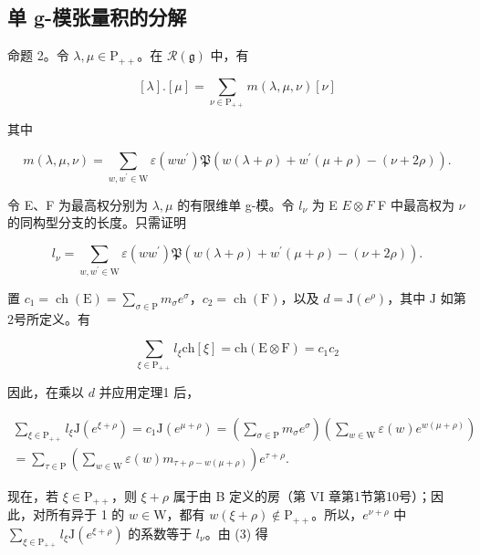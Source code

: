 \subsection{单 g-模张量积的分解}

命题 2。令 \(\lambda, \mu \in \mathrm{P}_{++}\)。在 \(\mathcal{R}(\mathfrak{g})\) 中，有

\[
[ \lambda ]. [ \mu ] = \sum_ {\nu \in \mathrm{P} _ {+ +}} m (\lambda , \mu , \nu) [ \nu ]
\]

其中

\[
m (\lambda , \mu , \nu) = \sum_ {w, w ^ {\prime} \in \mathrm{W}} \varepsilon (w w ^ {\prime}) \mathfrak {P} (w (\lambda + \rho) + w ^ {\prime} (\mu + \rho) - (\nu + 2 \rho)).
\]

令 E、F 为最高权分别为 \(\lambda, \mu\) 的有限维单 g-模。令 \(l_{\nu}\) 为 E \(E \otimes F\) F 中最高权为 \(\nu\) 的同构型分支的长度。只需证明

\[
l _ {\nu} = \sum_ {w, w ^ {\prime} \in \mathrm{W}} \varepsilon (w w ^ {\prime}) \mathfrak {P} (w (\lambda + \rho) + w ^ {\prime} (\mu + \rho) - (\nu + 2 \rho)).\tag{2}
\]

置 \(c_{1} = \operatorname{ch}(\mathrm{E}) = \sum_{\sigma \in \mathrm{P}} m_{\sigma} e^{\sigma}\)，\(c_{2} = \operatorname{ch}(\mathrm{F})\)，以及 \(d = \mathrm{J}(e^{\rho})\)，其中 \(\mathrm{J}\) 如第2号所定义。有

\[
\sum_ {\xi \in \mathrm{P} _ {+ +}} l _ {\xi} \mathrm{ch} [ \xi ] = \mathrm{ch} (\mathrm{E} \otimes \mathrm{F}) = c _ {1} c _ {2}
\]

因此，在乘以 \(d\) 并应用定理1 后，

\[
\begin{array}{c} \sum_ {\xi \in \mathrm{P} _ {+ +}} l _ {\xi} \mathrm{J} (e ^ {\xi + \rho}) = c _ {1} \mathrm{J} (e ^ {\mu + \rho}) = \left(\sum_ {\sigma \in \mathrm{P}} m _ {\sigma} e ^ {\sigma}\right) \left(\sum_ {w \in \mathrm{W}} \varepsilon (w) e ^ {w (\mu + \rho)}\right) \\ = \sum_ {\tau \in \mathrm{P}} \left(\sum_ {w \in \mathrm{W}} \varepsilon (w) m _ {\tau + \rho - w (\mu + \rho)}\right) e ^ {\tau + \rho}. \end{array}\tag{3}
\]

现在，若 \(\xi \in \mathrm{P}_{++}\)，则 \(\xi + \rho\) 属于由 B 定义的房（第 VI 章第1节第10号）；因此，对所有异于 1 的 \(w \in \mathrm{W}\)，都有 \(w(\xi + \rho) \notin \mathrm{P}_{++}\)。所以，\(e^{\nu + \rho}\) 中 \(\sum_{\xi \in \mathrm{P}_{++}} l_{\xi} \mathrm{J}(e^{\xi + \rho})\) 的系数等于 \(l_{\nu}\)。由 (3) 得

